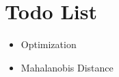 \section{Todo List}

\begin{itemize}
    \item Optimization
    \item Mahalanobis Distance
\end{itemize}
